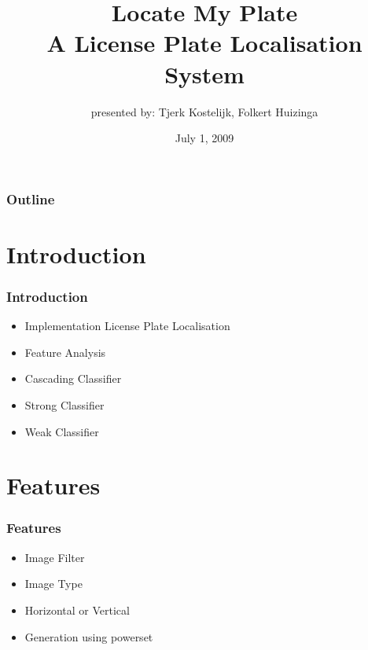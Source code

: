 \documentclass{beamer}
\title{Locate My Plate \\ A License Plate Localisation System}
\subtitle{presented by: Tjerk Kostelijk, Folkert Huizinga}
\date{July 1, 2009}
\begin{document}
\frame{\titlepage}

\setcounter{tocdepth}{1}

\frame
{
  \frametitle{Outline}
  \small
  \tableofcontents
  \normalsize
}

\setcounter{tocdepth}{2}

\section{Introduction}
\frame
{
  \frametitle{Introduction}
	
  \begin{itemize}
  \item <+-| alert@+> Implementation License Plate Localisation
  \item <+-| alert@+> Feature Analysis
  \item <+-| alert@+> Cascading Classifier
  \item <+-| alert@+> Strong Classifier
  \item <+-| alert@+> Weak Classifier
  \end{itemize}
}

\section{Features}
\frame
{
  \frametitle{Features}
	
  \begin{itemize}
  \item <+-| alert@+> Image Filter
  \item <+-| alert@+> Image Type
  \item <+-| alert@+> Horizontal or Vertical
  \item <+-| alert@+> Generation using powerset
  \end{itemize}
}
\end{document}
